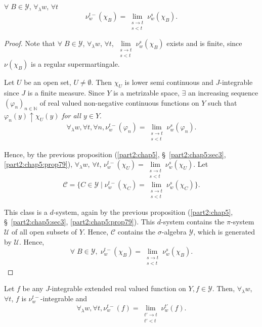 \begin{thm}\label{part2:chap5:thm80}
$\forall \; B \in \mathscr{Y}$, $\forall_\lambda w$, $\forall t$
$$
\nu^{t-}_w(\chi_B) = \lim\limits_{\substack{s \to t \\s<t}}
\nu^s_w(\chi_B). 
$$
\end{thm}

\begin{proof}
Note that $\forall \; B \in \mathscr{Y}$, $\forall_\lambda w$,
$\forall t$, $\lim\limits_{\substack{s\to t \\s<t}} \nu^s_w(\chi_B)$
exists and is finite, since $\nu(\chi_B)$ is a regular
supermartingale.

Let $U$ be an open set, $U \neq \emptyset$. Then $\chi_U$ is lower
semi continuous and $J$-integrable since $J$ is a finite
measure. Since $Y$ is a metrizable space, $\exists$ an increasing
sequence $(\varphi_n)_{n \in \mathbb{N}}$ of real valued non-negative
continuous functions on $Y$ such that $\varphi_n(y) \uparrow
\chi_U(y)$ {\em for all $y \in Y$}. 
$$
\forall_\lambda w, \forall t, \forall n, \nu^{t-}_w(\varphi_n) =
\lim\limits_{\substack{s\to t\\ s<t}} \nu^s_w(\varphi_n). 
$$

Hence, by the previous proposition (\ref{part2:chap5},
\S\ \ref{part2:chap5:sec3}, \ref{part2:chap5:prop79}),
$\forall_\lambda 
w$, $\forall t$, $\nu^{t-}_w(\chi_U) = \lim\limits_{\substack{s \to
    t\\s<t}} \nu^s_w(\chi_U)$. Let 
$$
\mathscr{C} = \{C \in \mathscr{Y} \mid \nu^{t-}_w(\chi_C) =
\lim\limits_{\substack{s\to t \\ s<t}} \nu^s_w(\chi_C)\} . 
$$

This class is a $d$-system, again by the previous proposition (\ref{part2:chap5},
\S\ \ref{part2:chap5:sec3}, \ref{part2:chap5:prop79}). This $d$-system
contains the $\pi$-system $\mathcal{U}$ of 
all open subsets of $Y$. Hence, $\mathscr{C}$ contains  the
$\sigma$-algebra $\mathscr{Y}$, which is generated by
$\mathcal{U}$. Hence,
$$
\forall \; B \in \mathscr{Y}, \; \nu^{t-}_w (\chi_B ) =
\lim\limits_{\substack{s \to t \\s <t}}  \nu^s_w(\chi_B).
$$
\end{proof}

\begin{proposition}\label{part2:chap5:prop81}
Let $f$ be any $J$-integrable extended real valued function on $Y, f
\in \mathscr{Y}$. Then, $\forall_\lambda w$, $\forall t$, $f$ is
$\nu^{t-}_{w}$-integrable and 
$$
\forall_\lambda w, \forall t, \nu^{t-}_w(f) =
\lim\limits_{\substack{t'\to t\\t'<t}} \nu^{t'}_w(f). 
$$\pageoriginale
\end{proposition}

